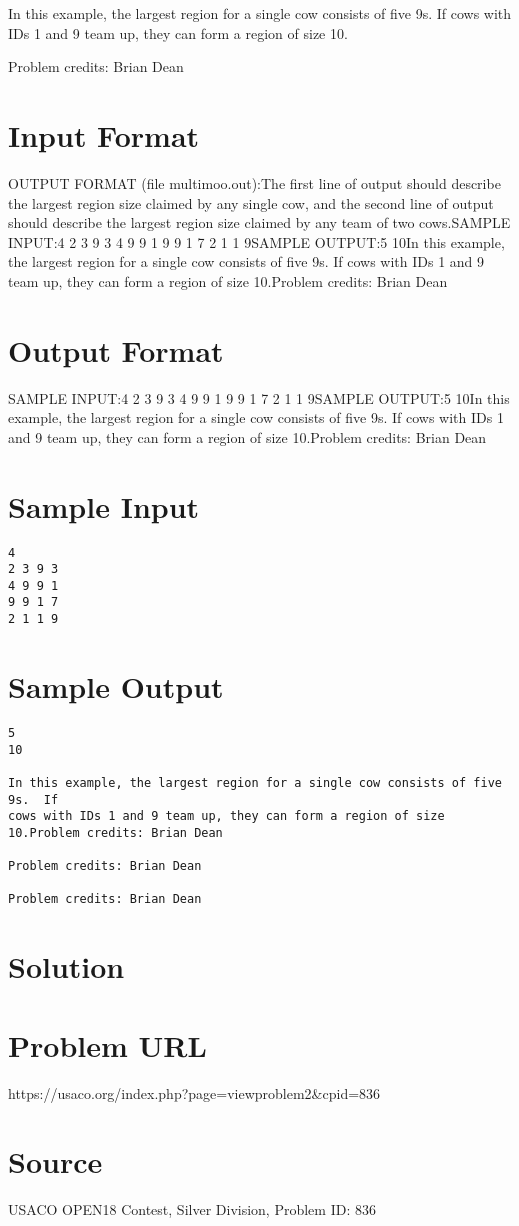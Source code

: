 \documentclass[12pt]{article}
\begin{document}
In this example, the largest region for a single cow consists of five 9s.  If 
cows with IDs 1 and 9 team up, they can form a region of size 10.


Problem credits: Brian Dean



\section*{Input Format}
OUTPUT FORMAT (file multimoo.out):The first line of output should describe the largest region size claimed by any
single cow, and the second line of output should describe the largest region
size claimed by any team of two cows.SAMPLE INPUT:4
2 3 9 3
4 9 9 1
9 9 1 7
2 1 1 9SAMPLE OUTPUT:5
10In this example, the largest region for a single cow consists of five 9s.  If 
cows with IDs 1 and 9 team up, they can form a region of size 10.Problem credits: Brian Dean

\section*{Output Format}
SAMPLE INPUT:4
2 3 9 3
4 9 9 1
9 9 1 7
2 1 1 9SAMPLE OUTPUT:5
10In this example, the largest region for a single cow consists of five 9s.  If 
cows with IDs 1 and 9 team up, they can form a region of size 10.Problem credits: Brian Dean

\section*{Sample Input}
\begin{verbatim}
4
2 3 9 3
4 9 9 1
9 9 1 7
2 1 1 9
\end{verbatim}

\section*{Sample Output}
\begin{verbatim}
5
10

In this example, the largest region for a single cow consists of five 9s.  If 
cows with IDs 1 and 9 team up, they can form a region of size 10.Problem credits: Brian Dean

Problem credits: Brian Dean

Problem credits: Brian Dean
\end{verbatim}

\section*{Solution}


\section*{Problem URL}
https://usaco.org/index.php?page=viewproblem2&cpid=836

\section*{Source}
USACO OPEN18 Contest, Silver Division, Problem ID: 836
\end{document}
